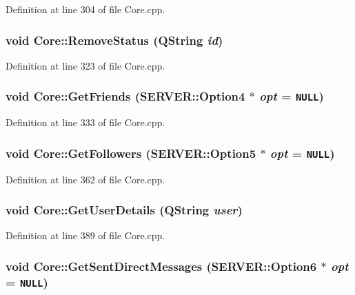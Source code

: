Definition at line 304 of file Core.cpp.\hypertarget{classCore_d881d4987b2845589443f74fb81da766}{
\subsubsection{\setlength{\rightskip}{0pt plus 5cm}void Core::RemoveStatus (QString {\em id})}}
\label{classCore_d881d4987b2845589443f74fb81da766}




Definition at line 323 of file Core.cpp.\hypertarget{classCore_2d41bfdcb5a2dff232ee299e83a7c8e6}{
\subsubsection{\setlength{\rightskip}{0pt plus 5cm}void Core::GetFriends ({\bf SERVER::Option4} $\ast$ {\em opt} = {\tt NULL})}}
\label{classCore_2d41bfdcb5a2dff232ee299e83a7c8e6}




Definition at line 333 of file Core.cpp.\hypertarget{classCore_635c5c7bb0b6d2c2c6250ac050b466d6}{
\subsubsection{\setlength{\rightskip}{0pt plus 5cm}void Core::GetFollowers ({\bf SERVER::Option5} $\ast$ {\em opt} = {\tt NULL})}}
\label{classCore_635c5c7bb0b6d2c2c6250ac050b466d6}




Definition at line 362 of file Core.cpp.\hypertarget{classCore_572cef51b68ea351bdda246b5070c399}{
\subsubsection{\setlength{\rightskip}{0pt plus 5cm}void Core::GetUserDetails (QString {\em user})}}
\label{classCore_572cef51b68ea351bdda246b5070c399}




Definition at line 389 of file Core.cpp.\hypertarget{classCore_1b43e65adc3ba72ae2bb344bec27eb53}{
\subsubsection{\setlength{\rightskip}{0pt plus 5cm}void Core::GetSentDirectMessages ({\bf SERVER::Option6} $\ast$ {\em opt} = {\tt NULL})}}
\label{classCore_1b43e65adc3ba72ae2bb344bec27eb53}




